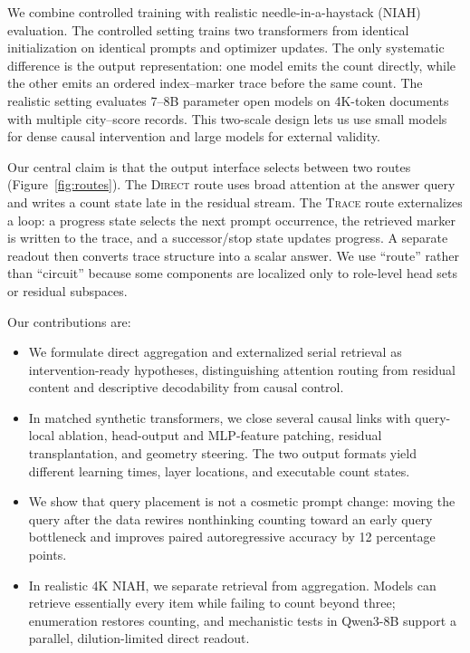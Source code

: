 \documentclass[11pt]{article}
\newcommand{\nt}{\textsc{Direct}}
\newcommand{\traceroute}{\textsc{Trace}}
\begin{document}
We combine controlled training with realistic needle-in-a-haystack (NIAH) evaluation. The controlled setting trains two transformers from identical initialization on identical prompts and optimizer updates. The only systematic difference is the output representation: one model emits the count directly, while the other emits an ordered index--marker trace before the same count. The realistic setting evaluates 7--8B parameter open models on 4K-token documents with multiple city--score records. This two-scale design lets us use small models for dense causal intervention and large models for external validity.

Our central claim is that the output interface selects between two routes (Figure~\ref{fig:routes}). The \nt{} route uses broad attention at the answer query and writes a count state late in the residual stream. The \traceroute{} route externalizes a loop: a progress state selects the next prompt occurrence, the retrieved marker is written to the trace, and a successor/stop state updates progress. A separate readout then converts trace structure into a scalar answer. We use ``route'' rather than ``circuit'' because some components are localized only to role-level head sets or residual subspaces.

Our contributions are:
\begin{itemize}
    \item We formulate direct aggregation and externalized serial retrieval as intervention-ready hypotheses, distinguishing attention routing from residual content and descriptive decodability from causal control.
    \item In matched synthetic transformers, we close several causal links with query-local ablation, head-output and MLP-feature patching, residual transplantation, and geometry steering. The two output formats yield different learning times, layer locations, and executable count states.
    \item We show that query placement is not a cosmetic prompt change: moving the query after the data rewires nonthinking counting toward an early query bottleneck and improves paired autoregressive accuracy by 12 percentage points.
    \item In realistic 4K NIAH, we separate retrieval from aggregation. Models can retrieve essentially every item while failing to count beyond three; enumeration restores counting, and mechanistic tests in Qwen3-8B support a parallel, dilution-limited direct readout.
\end{itemize}
\end{document}
